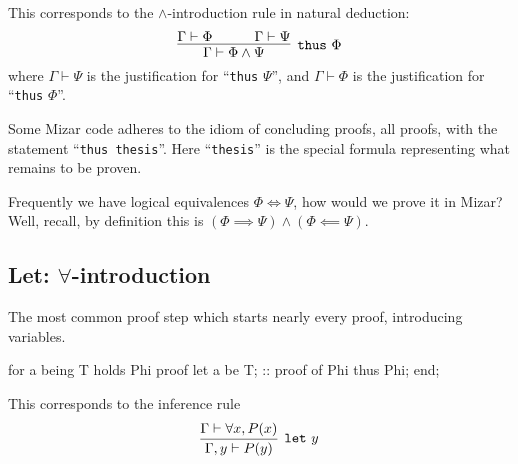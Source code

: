 This corresponds to the $\land$-introduction rule in natural deduction:
\begin{equation}
  \vcenter{\infer[\mathtt{thus}~\Phi]{\Gamma\vdash\Phi\land\Psi}{
    \Gamma\vdash\Phi &\qquad \Gamma\vdash\Psi}}
\end{equation}
where $\Gamma\vdash\Psi$ is the justification for ``\lstinline{thus} $\Psi$'',
and $\Gamma\vdash\Phi$ is the justification for ``\lstinline{thus} $\Phi$''.

\begin{idiom}
Some Mizar code adheres to the idiom of concluding proofs, all proofs,
with the statement ``\lstinline{thus thesis}''. Here ``\lstinline{thesis}'' is the
special formula representing what remains to be proven.
\end{idiom}

\begin{exercise}
Frequently we have logical equivalences $\Phi\iff\Psi$, how would we
prove it in Mizar? Well, recall, by definition this is
$(\Phi\implies\Psi)\land(\Phi\impliedby\Psi)$.
\end{exercise}

\subsection{Let: $\forall$-introduction}
The most common proof step which starts nearly every proof, introducing
variables.

\begin{mizar}
for a being T holds Phi
proof
  let a be T;
  :: proof of Phi
  thus Phi;
end;
\end{mizar}%
This corresponds to the inference rule
\begin{equation}
\vcenter{\infer[\mathtt{let}~y]{\Gamma,y\vdash P(y)}{\Gamma\vdash\forall x,P(x)}}
\end{equation}

